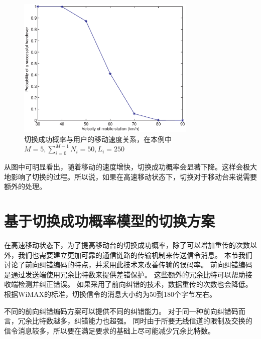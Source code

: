 \begin{figure}[t]
\begin{centering}
\includegraphics[height=6.75cm]{iccs_speed_prob_theroy}
\caption{切换成功概率与用户的移动速度关系，在本例中~$M=5, \sum_{i=0}^{M-1}N_i=50, L_i=250$~}
\label{fig:chap_iccs_handover_algorithm_Pro_V}
\end{centering}
\end{figure}

从图中可明显看出，随着移动的速度增快，切换成功概率会显著下降。这样会极大地影响了切换的过程。所以说，如果在高速移动状态下，切换对于移动台来说需要额外的处理。

\section{基于切换成功概率模型的切换方案}
在高速移动状态下，为了提高移动台的切换成功概率，除了可以增加重传的次数以外，我们也需要建立更加可靠的通信链路的传输机制来传送信令消息。
本节我们讨论了前向纠错编码的特点，并采用此技术来改善传输的误码率。
前向纠错编码是通过发送端使用冗余比特数来提供差错保护。
这些额外的冗余比特可以帮助接收端检测并纠正错误。
如果采用了前向纠错的技术，数据重传的次数也会降低。
根据WiMAX的标准，切换信令的消息大小约为50到180个字节左右。

不同的前向纠错编码方案可以提供不同的纠错能力。
对于同一种前向纠错码而言，冗余比特数越多，纠错能力也超强。
同时由于所要无线信道的限制及交换的信令消息较多，所以要在满足要求的基础上尽可能减少冗余比特数。

